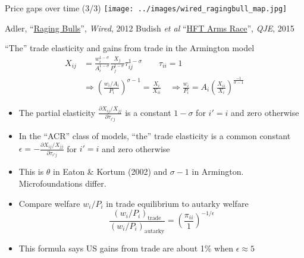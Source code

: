\documentclass[10pt,notes=hide,aspectratio=169]{beamer}
\begin{document}
\begin{frame}{Price gaps over time (3/3)}
\texttt{[image: ../images/wired\_ragingbull\_map.jpg]}
\begin{center}\footnotesize{Adler, ``\href{https://www.wired.com/2012/08/ff_wallstreet_trading/}{Raging Bulls}'', \textit{Wired}, 2012} \hfill Budish \textit{et al} ``\href{https://faculty.chicagobooth.edu/eric.budish/research/HFT-FrequentBatchAuctions.pdf}{HFT Arms Race}'', \textit{QJE}, 2015 \end{center}
\end{frame}
\begin{frame}{``The'' trade elasticity and gains from trade in the Armington model}
\begin{align*}
X_{ij}
&= \frac{w_i^{1-\sigma}}{A_i^{1-\sigma}} \frac{X_j}{P_j^{1-\sigma}}\tau_{ij}^{1-\sigma} 
\qquad \tau_{ii}=1	
\\
&\Rightarrow
\left(\frac{w_i/A_i}{P_i}\right)^{\sigma-1}
=
\frac{X_i}{X_{ii}}
\quad
\Rightarrow
\frac{w_i}{P_i} 
=A_i \left(\frac{X_{ii}}{X_i}\right)^{\frac{-1}{\sigma-1}}
\end{align*}
\begin{itemize}
\item The partial elasticity
$\frac{\partial X_{ij}/X_{jj}}{\partial \tau_{i'j}}$
is a constant
$1-\sigma$ for $i'=i$ and zero otherwise
\item In the ``ACR'' class of models,
``the'' trade elasticity is a common constant
$\epsilon = -\frac{\partial X_{ij}/X_{jj}}{\partial \tau_{i'j}}$ for $i'=i$ and zero otherwise
	\item This is $\theta$ in Eaton \& Kortum (2002) and $\sigma-1$ in Armington. Microfoundations differ.
	\item Compare welfare $w_i/P_i$ in trade equilibrium to autarky welfare
	$$
	\frac{(w_i / P_i)_{\text{trade}}}
	{(w_i / P_i)_{\text{autarky}}}
	=
	\left(\frac{\pi_{ii}}{1}\right)^{-1/\epsilon} 
	$$
	\item This formula says US gains from trade are about 1\% when $\epsilon\approx 5$
\end{itemize}
\end{frame}
\end{document}
